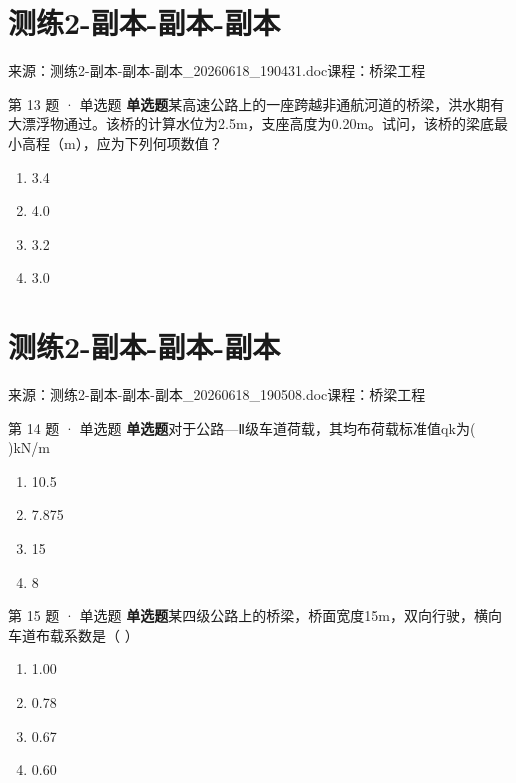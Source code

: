 \documentclass[UTF8,zihao=-4,openany]{ctexbook}
\newenvironment{choices}{\begin{enumerate}[label=\Alph*.,leftmargin=9mm,labelsep=3mm,itemsep=2pt,topsep=4pt]}{\end{enumerate}}
\newcommand{\qtype}[1]{\textcolor{brand}{\sffamily\bfseries #1}}
\newcommand{\sourcefile}[1]{\textcolor{muted}{\small\sffamily 来源：#1}}
\begin{document}
\chapter{测练2-副本-副本-副本}

\sourcefile{测练2-副本-副本-副本\_20260618\_190431.doc}\quad \textcolor{muted}{\small\sffamily 课程：桥梁工程}

\begin{questionbox}{第 13 题 · 单选题}
\qtype{单选题}\quad 某高速公路上的一座跨越非通航河道的桥梁，洪水期有大漂浮物通过。该桥的计算水位为2.5m，支座高度为0.20m。试问，该桥的梁底最小高程（m），应为下列何项数值？
\begin{choices}
\item 3.4
\item 4.0
\item 3.2
\item 3.0
\end{choices}
\end{questionbox}

\chapter{测练2-副本-副本-副本}

\sourcefile{测练2-副本-副本-副本\_20260618\_190508.doc}\quad \textcolor{muted}{\small\sffamily 课程：桥梁工程}

\begin{questionbox}{第 14 题 · 单选题}
\qtype{单选题}\quad 对于公路—Ⅱ级车道荷载，其均布荷载标准值qk为( )kN/m
\begin{choices}
\item 10.5
\item 7.875
\item 15
\item 8
\end{choices}
\end{questionbox}

\begin{questionbox}{第 15 题 · 单选题}
\qtype{单选题}\quad 某四级公路上的桥梁，桥面宽度15m，双向行驶，横向车道布载系数是（ ）
\begin{choices}
\item 1.00
\item 0.78
\item 0.67
\item 0.60
\end{choices}
\end{questionbox}
\end{document}
